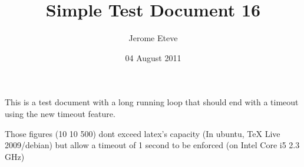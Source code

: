 \documentclass{article}
\date{04 August 2011}
\author{Jerome Eteve}
\title{Simple Test Document 16}
\begin{document}
\maketitle

This is a test document with a long running loop that should end with a timeout
using the new timeout feature.

Those figures (10 10 500) dont exceed latex's capacity (In ubuntu, TeX Live 2009/debian)
but allow a timeout of 1 second to be enforced (on Intel Core i5 \@ 2.3 GHz)

\end{document}

